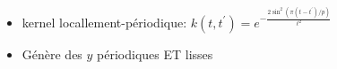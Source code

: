 \documentclass[xcolor=svgnames, t]{beamer}
\begin{document}
\begin{frame}{\subsecname}  
  \begin{itemize}
    \item<1-> kernel locallement-périodique:
    $k (t, t^\prime) = e^{- \frac{2 \sin^2(\pi (t - t^\prime) / p)}{\ell^2}}$
    \item<1-> Génère des $y$ périodiques ET lisses
  \end{itemize}
  \begin{figure}
  \end{figure}
\end{frame}
\end{document}
